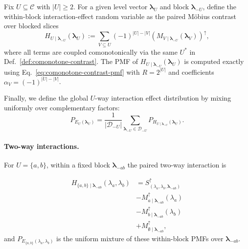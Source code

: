 Fix $U\subseteq\mathcal{C}$ with $|U|\ge 2$. For a given level vector
$\boldsymbol{\lambda}_U$ and block $\boldsymbol{\lambda}_{-U}$, define the
within-block interaction-effect random variable as the paired M\"obius contrast
over blocked slices
\begin{equation}
\label{eq:interaction-block}
H_{U\mid \boldsymbol{\lambda}_{-U}}(\boldsymbol{\lambda}_U)
:=
\sum_{V\subseteq U}
(-1)^{|U|-|V|}
\left(M_{V\mid \boldsymbol{\lambda}_{-U}}(\boldsymbol{\lambda}_V)\right)^\uparrow,
\end{equation}
where all terms are coupled comonotonically via the same $U^\ast$ in
Def.~\ref{def:comonotone-contrast}. The PMF of
$H_{U\mid \boldsymbol{\lambda}_{-U}}(\boldsymbol{\lambda}_U)$ is computed exactly
using Eq.~\eqref{eq:comonotone-contrast-pmf} with $R=2^{|U|}$ and coefficients
$\alpha_V=(-1)^{|U|-|V|}$.

Finally, we define the global $U$-way interaction effect distribution by mixing
uniformly over complementary factors:
\begin{equation}
\label{eq:interaction-global}
P_{E_U(\boldsymbol{\lambda}_U)}
=
\frac{1}{|\mathcal{D}_{-U}|}
\sum_{\boldsymbol{\lambda}_{-U}\in\mathcal{D}_{-U}}
P_{H_{U\mid \boldsymbol{\lambda}_{-U}}(\boldsymbol{\lambda}_U)}.
\end{equation}

\paragraph{Two-way interactions.}
For $U=\{a,b\}$, within a fixed block $\boldsymbol{\lambda}_{-ab}$ the paired
two-way interaction is

\begin{align}
H_{\{a,b\}\mid \boldsymbol{\lambda}_{-ab}}(\lambda_a,\lambda_b)
&=
S_{(\lambda_a,\lambda_b,\boldsymbol{\lambda}_{-ab})}^\uparrow \\
&-
M_{a\mid \boldsymbol{\lambda}_{-ab}}^\uparrow(\lambda_a) \\
&-
M_{b\mid \boldsymbol{\lambda}_{-ab}}^\uparrow(\lambda_b) \\
&+
M_{\emptyset\mid \boldsymbol{\lambda}_{-ab}}^\uparrow, 
\end{align}
and $P_{E_{\{a,b\}}(\lambda_a,\lambda_b)}$ is the uniform mixture of these
within-block PMFs over $\boldsymbol{\lambda}_{-ab}$.

